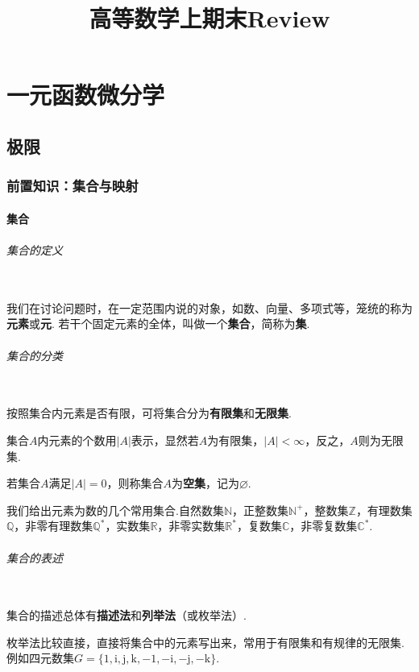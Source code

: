 \documentclass{ctexbook}
\title{高等数学上期末Review}
\begin{document}
	\part{一元函数微分学}
	\chapter{极限}
	\section{前置知识：集合与映射}
	\subsection{集合}
	\paragraph{集合的定义}~{}
	\\
	\indent
	我们在讨论问题时，在一定范围内说的对象，如数、向量、多项式等，笼统的称为\textbf{元素}或\textbf{元}.
	若干个固定元素的全体，叫做一个\textbf{集合}，简称为\textbf{集}.
	
	\paragraph{集合的分类}~{}
	\\
	\indent
	按照集合内元素是否有限，可将集合分为\textbf{有限集}和\textbf{无限集}.
	
	集合$A$内元素的个数用$|A|$表示，显然若$A$为有限集，$|A|<\infty$，反之，$A$则为无限集.
	
	若集合$A$满足$|A|=0$，则称集合$A$为\textbf{空集}，记为$\varnothing$.
	
	我们给出元素为数的几个常用集合.自然数集$\mathbb{N}$，正整数集$\mathbb{N^+}$，整数集$\mathbb{Z}$，有理数集$\mathbb{Q}$，非零有理数集$\mathbb{Q^*}$，实数集$\mathbb{R}$，非零实数集$\mathbb{R^*}$，复数集$\mathbb{C}$，非零复数集$\mathbb{C^*}$.
	
	\paragraph{集合的表述}~{}
	\\
	\indent
	集合的描述总体有\textbf{描述法}和\textbf{列举法}（或枚举法）.
	
	枚举法比较直接，直接将集合中的元素写出来，常用于有限集和有规律的无限集.例如四元数集$G=\{1,\mathrm{i},\mathrm{j},\mathrm{k},-1,-\mathrm{i},-\mathrm{j},-\mathrm{k}\}$.
	
\end{document}
